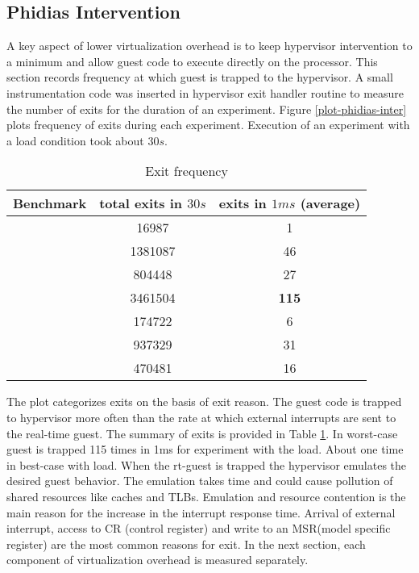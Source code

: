 \subsection{Phidias Intervention}



A key aspect of lower virtualization overhead is to keep hypervisor intervention to a minimum and allow guest code to execute directly on the processor.
This section records frequency at which guest is trapped to the hypervisor.
A small instrumentation code was inserted in hypervisor exit handler routine to measure the number of exits for the duration of an experiment. 
Figure \ref{plot-phidias-inter} plots frequency of exits during each experiment. 
Execution of an experiment with a load condition took about $30s$.

\begin{table}[!h]
\centering
\begin{tabular}{|r|c|c|}  
	\hline
    \textbf{Benchmark}	&	\textbf{total exits in $30s$}	&	\textbf{exits in $1ms$} (average) \\ \hline
	\mcachepressure{}	&		16987	&	1 	\\ \hline
	\mforkops{}	&			1381087	&	46 		\\ \hline
	\mfileops{}	&			804448	&	27 		\\ \hline
	\mhackbench{}	&		3461504	&	\textbf{115} \\ \hline
	\mmmapops{}	&			174722	&	6		 \\ \hline
	\mstdout{}	&			937329	&	31 		\\ \hline
	\mthreadops{}	&		470481	&	16 		\\ \hline
\end{tabular}
\caption{Exit frequency}
\label{exit-frequency}
\end{table}

The plot categorizes exits on the basis of exit reason. 
The guest code is trapped to hypervisor more often than the rate at which external interrupts are sent to the real-time guest.
The summary of exits is provided in Table \ref{exit-frequency}.
In worst-case guest is trapped 115 times in 1ms for experiment with the \mhackbench{} load. About one time in best-case with \mcachepressure{} load.
When the rt-guest is trapped the hypervisor emulates the desired guest behavior. The emulation takes time and could cause pollution of shared resources like caches and TLBs. Emulation and resource contention is the main reason for the increase in the interrupt response time.
Arrival of external interrupt, access to CR (control register) and write to an MSR(model specific register) are the most common reasons for exit.
In the next section, each component of virtualization overhead is measured separately.


